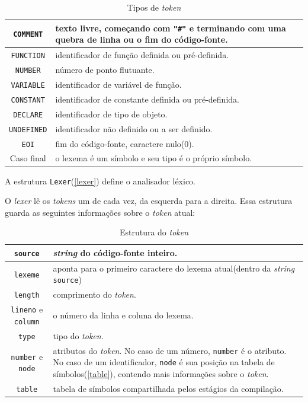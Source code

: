 \begin{table}[ht]
\caption{Tipos de \textit{token}}
\label{tokentypes}
\begin{centering}
\begin{tabularx}{\textwidth}{||c|X||}
\hline \texttt{COMMENT} & texto livre, começando com \texttt{"\#"} e
terminando com uma quebra de linha ou o fim do código-fonte.\\ 
\hline \texttt{FUNCTION} & identificador de função definida ou pré-definida.\\
\hline \texttt{NUMBER} & número de ponto flutuante.\\
\hline \texttt{VARIABLE} & identificador de variável de função.\\
\hline \texttt{CONSTANT} &identificador de constante definida ou pré-definida.\\
\hline \texttt{DECLARE} & identificador de tipo de objeto.\\
\hline \texttt{UNDEFINED} & identificador não definido ou a ser definido.\\
\hline \texttt{EOI} & fim do código-fonte, caractere nulo(0).\\
\hline Caso final & o lexema é um símbolo e seu tipo é o próprio símbolo.\\
\hline
\end{tabularx}
\end{centering}
\end{table}

A estrutura \texttt{Lexer}(\ref{lexer}) define o analisador léxico.
\lstset{language=c++}

O \textit{lexer} lê os \textit{tokens} um de cada vez, da esquerda para a direita.
Essa estrutura guarda as seguintes informações sobre o \textit{token} atual:

\begin{table}[ht]
\caption{Estrutura do \textit{token}}
\label{token}
\begin{centering}
\begin{tabularx}{\textwidth}{||c|X||}
\hline \texttt{source} & \textit{string} do código-fonte inteiro. \\
\hline \texttt{lexeme} & aponta para o primeiro caractere do lexema atual(dentro da \textit{string} \texttt{source}) \\
\hline \texttt{length} & comprimento do \textit{token}. \\
\hline \texttt{lineno} e \texttt{column} & o número da linha e coluna do lexema. \\
\hline \texttt{type} & tipo do \textit{token}. \\
\hline \texttt{number} e \texttt{node} & atributos do \textit{token}.
No caso de um número, \texttt{number} é o atributo.
No caso de um identificador, \texttt{node} é sua posição na tabela de símbolos(\ref{table}),
contendo mais informações sobre o \textit{token}. \\
\hline \texttt{table} & tabela de símbolos compartilhada pelos estágios da compilação. \\
\hline
\end{tabularx}
\end{centering}
\end{table}

